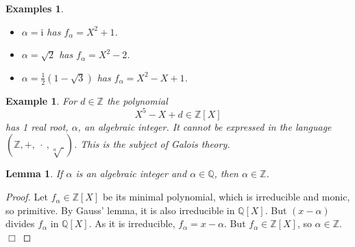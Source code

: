 \documentclass{article}
\theoremstyle{plain}\theoremheaderfont{\normalfont\itshape}\theorembodyfont{\rmfamily}\theoremseparator{.}\newtheorem*{rem}{Remark}\newtheorem*{ex}{Example}\newtheorem*{proof}{Proof}\newtheorem*{altp}{Alternative proof}\newtheorem*{nonex}{Non-Example}
\theoremstyle{plain}\theoremheaderfont{\normalfont\bfseries}\theorembodyfont{\rmfamily}\theoremseparator{.}\newtheorem{thm}{Theorem}[section]\newtheorem{lem}[thm]{Lemma}\newtheorem{prop}[thm]{Proposition}\newtheorem*{cor}{Corollary}\newtheorem{defn}[thm]{Definition}\newtheorem{clm}[thm]{Claim}\newtheorem{clminproof}{Claim}\newtheorem*{notn}{Notation}\newtheorem*{exer}{Exercise}\newtheorem*{lemnn}{Lemma}
\theoremstyle{break}\theoremheaderfont{\normalfont\itshape}\theorembodyfont{\rmfamily}\theoremseparator{.\medskip}\newtheorem*{proofskip}{Proof}\newtheorem*{exs}{Examples}\newtheorem*{rems}{Remarks}\newtheorem*{obs}{Observations}
\theoremstyle{break}\theoremheaderfont{\normalfont\bfseries}\theorembodyfont{\rmfamily}\theoremseparator{.\medskip}\newtheorem{lemskip}[thm]{Lemma}\newtheorem{defnskip}[thm]{Definition}\newtheorem{propskip}[thm]{Proposition}\newtheorem{thmskip}[thm]{Theorem}
\numberwithin{equation}{section}
\newcommand{\qed}{\hfill\ensuremath{\Box}}
\newcommand{\ii}{\mathrm{i}}
\newcommand{\ZZ}{\mathbb{Z}}
\newcommand{\QQ}{\mathbb{Q}}
\begin{document}
    \begin{exs}
        \begin{itemize}
            \item \(\alpha=\ii\) has \(f_\alpha=X^2+1\).
            \item \(\alpha=\sqrt{2}\) has \(f_\alpha=X^2-2\).
            \item \(\alpha=\frac{1}{2}(1-\sqrt{3})\) has \(f_\alpha=X^2-X+1\).
        \end{itemize}
    \end{exs}
    \begin{ex}
        For \(d\in\ZZ\) the polynomial
        \[X^5-X+d\in\ZZ[X]\]
        has 1 real root, \(\alpha\), an algebraic integer. It cannot be expressed in the language \((\ZZ,+,\ \cdot \ , \sqrt[n]{\ })\). This is the subject of Galois theory.
    \end{ex}
    \begin{lem}
        If \(\alpha\) is an algebraic integer and \(\alpha\in\QQ\), then \(\alpha\in\ZZ\).
    \end{lem}
    \begin{proof}
        Let \(f_\alpha\in\ZZ[X]\) be its minimal polynomial, which is irreducible and monic, so primitive. By Gauss' lemma, it is also irreducible in \(\QQ[X]\). But \((x-\alpha)\) divides \(f_\alpha\) in \(\QQ[X]\). As it is irreducible, \(f_\alpha=x-\alpha\). But \(f_\alpha\in\ZZ[X]\), so \(\alpha\in\ZZ\).\qed
    \end{proof}
\end{document}
